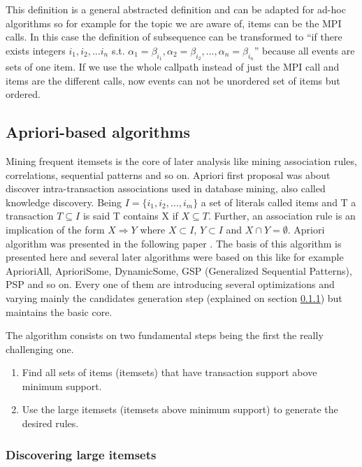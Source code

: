 This definition is a general abstracted definition and can be adapted for
ad-hoc algorithms so for example for the topic we are aware of, items can be the
MPI calls. In this case the
definition of subsequence can be transformed to “if there exists integers 
$i_{1}, i_{2}, \dots i_{n}$ s.t. $\alpha_{1} = \beta_{i_{1}}, 
\alpha_{2} = \beta_{i_{2}}, \dots, \alpha_{n} = \beta_{i_{n}}$” because all
events are sets of one item. If we use the whole callpath instead of just the
MPI call and items are the different calls, now events can not be unordered set
of items but ordered. 

\subsection{Apriori-based algorithms}\label{ss:apriori_based}

Mining frequent itemsets is the core of later analysis like mining association
rules, correlations, sequential patterns and so on. Apriori first proposal was
about discover intra-transaction associations used
in database mining, also called knowledge discovery.
Being $I=\{i_{1}, i_{2}, \dots,i_{m}\}$ a set of literals called items and T a
transaction $T \subseteq I$ is said T contains X if $X \subseteq T$. Further, an
association rule is an implication of the form $X \Rightarrow Y$ where $X
\subset I$, $Y \subset I$ and $X \cap Y = \emptyset$. Apriori algorithm was
presented in the following paper \cite{agrawalfast}. The basis of this algorithm
is presented here and several later algorithms were based on this like for
example AprioriAll, AprioriSome, DynamicSome, GSP (Generalized Sequential
Patterns), PSP and so on. Every one of them are introducing several
optimizations and varying mainly the candidates generation step (explained on
section \ref{ss:discovering_large_itemsets}) but maintains 
the basic core.

The algorithm consists on two fundamental steps being the first the really
challenging one.
\begin{enumerate}
  \item Find all sets of items (itemsets) that have transaction support above
    minimum support.
  \item Use the large itemsets (itemsets above minimum support) to generate the
    desired rules.
\end{enumerate}

\subsubsection{Discovering large itemsets}\label{ss:discovering_large_itemsets}

